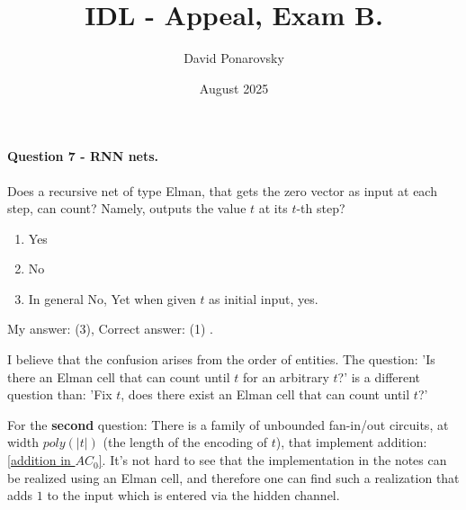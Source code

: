 \documentclass{article}
\title{IDL - Appeal, Exam B. }
\author{David Ponarovsky}
\date{August 2025}
\newcommand{\inb}[1]{ \color{blue}#1 \color{black} }
\begin{document}
\maketitle

\paragraph{ Question 7 - RNN nets.} 
Does a recursive net of type Elman, that gets the zero vector as input at each step, can count? Namely, outputs the value $t$ at its $t$-th step?
\begin{enumerate}
  \item Yes
  \item No
  \item In general No, Yet when given $t$ as initial input, yes. 
\end{enumerate}
\inb{ My answer: (3), Correct answer: (1)}. 




I believe that the confusion arises from the order of entities. The question: 'Is there an Elman cell that can count until $t$ for an arbitrary $t$?' is a different question than: 'Fix $t$, does there exist an Elman cell that can count until $t$?'

For the \textbf{second} question: There is a family of unbounded fan-in/out circuits, at width $poly(|t|)$ (the length of the encoding of $t$), that implement addition: \href{https://people.clarkson.edu/~alexis/PCMI/Notes/lectureB02.pdf}{[addition in $AC_{0}$]}. It's not hard to see that the implementation in the notes can be realized using an Elman cell, and therefore one can find such a realization that adds $1$ to the input which is entered via the hidden channel.
\end{document}
